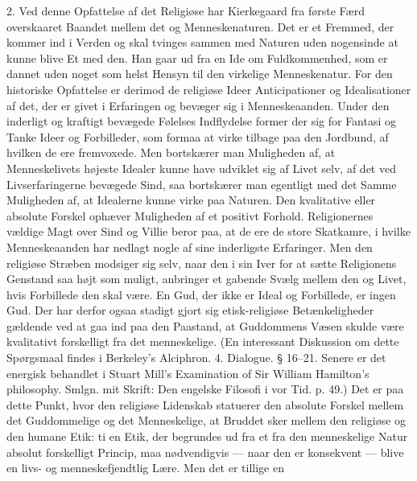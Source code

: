 \documentclass[12pt,a4paper,openany]{book}
\newcommand{\opage}[1]{\marginnote{\footnotesize\textit{[#1]}}}
\begin{document}
2. Ved denne Opfattelse af det Religiøse har Kierkegaard
fra første Færd overskaaret Baandet mellem det
og Menneskenaturen. Det er et Fremmed, der kommer
ind i Verden og skal tvinges sammen med Naturen uden
nogensinde at kunne blive Et med den. Han gaar ud
fra en Ide om Fuldkommenhed, som er dannet uden
noget som helst Hensyn til den virkelige Menneskenatur.
For den historiske Opfattelse er derimod de religiøse
Ideer Anticipationer og Idealisationer af det, der er
givet i Erfaringen og bevæger sig i Menneskeaanden.
Under den inderligt og kraftigt bevægede Følelses Indflydelse
former der sig for Fantasi og Tanke Ideer og
Forbilleder, som formaa at virke tilbage paa den Jordbund,
af hvilken de ere fremvoxede. Men bortskærer
man Muligheden af, at Menneskelivets højeste Idealer
kunne have udviklet sig af Livet selv, af det ved Livserfaringerne
bevægede Sind, saa bortskærer man egentligt
med det Samme Muligheden af, at Idealerne kunne
virke paa Naturen. Den kvalitative eller absolute Forskel
ophæver Muligheden af et positivt Forhold. Religionernes
vældige Magt over Sind og Villie beror paa, at
de ere de store Skatkamre, i hvilke Menneskeaanden har
nedlagt nogle af sine inderligste Erfaringer. Men den
religiøse Stræben modsiger sig selv, naar den i sin Iver
for at sætte Religionens Genstand saa højt som muligt,
anbringer et gabende Svælg mellem den og Livet, hvis
Forbillede den skal være. En Gud, der ikke er Ideal
og Forbillede, er ingen Gud. Der har derfor ogsaa stadigt
gjort sig etisk-religiøse Betænkeligheder gældende
\opage{115}ved at gaa ind paa den Paastand, at Guddommens Væsen
skulde være kvalitativt forskelligt fra det menneskelige.
(En interessant Diskussion om dette Spørgsmaal findes i
Berkeley's Alciphron. 4. Dialogue. § 16--21. Senere
er det energisk behandlet i Stuart Mill's Examination of
Sir William Hamilton's philosophy. Smlgn. mit Skrift:
Den engelske Filosofi i vor Tid. p. 49.) Det er paa
dette Punkt, hvor den religiøse Lidenskab statuerer den
absolute Forskel mellem det Guddommelige og det Menneskelige,
at Bruddet sker mellem den religiøse og den
humane Etik: ti en Etik, der begrundes ud fra et fra
den menneskelige Natur absolut forskelligt Princip, maa
nødvendigvis --- naar den er konsekvent --- blive en
livs- og menneskefjendtlig Lære. Men det er tillige en
\end{document}
